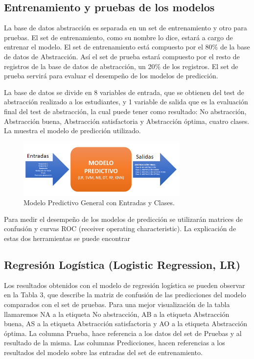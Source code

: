 \documentclass{textolivre}
\begin{document}
\subsection{Entrenamiento y pruebas de los modelos}
La base de datos abstracción es separada en un set de entrenamiento y otro para pruebas. El set de entrenamiento, como su nombre lo dice, estará a cargo de entrenar el modelo. El set de entrenamiento está compuesto por el 80\% de la base de datos de Abstracción. Así el set de prueba estará compuesto por el resto de registros de la base de datos de abstracción, un 20\% de los registros. El set de prueba servirá para evaluar el desempeño de los modelos de predicción.

La base de datos se divide en 8 variables de entrada, que se obtienen del test de abstracción realizado a los estudiantes, y 1 variable de salida que es la evaluación final del test de abstracción, la cual puede tener como resultado: No abstracción, Abstracción buena, Abstracción satisfactoria y Abstracción óptima, cuatro clases. La  muestra el modelo de predicción utilizado.

\begin{figure}[htbp]
 \centering
 \includegraphics[width=0.75\textwidth]{figura7.png}
 \caption{Modelo Predictivo General con Entradas y Clases.}
 \label{figura7}
\end{figure}

Para medir el desempeño de los modelos de predicción se utilizarán matrices de confusión y curvas ROC (receiver operating characteristic). La explicación de estas dos herramientas se puede encontrar \cite{chambers1992} %

\subsection{Regresión Logística (Logistic Regression, LR)}
Los resultados obtenidos con el modelo de regresión logística se pueden observar en la Tabla 3, que describe la matriz de confusión de las predicciones del modelo comparados con el set de pruebas. Para una mejor visualización de la tabla llamaremos NA a la etiqueta No abstracción, AB a la etiqueta Abstracción buena, AS a la etiqueta Abstracción satisfactoria y AO a la etiqueta Abstracción óptima. La columna Prueba, hace referencia a los datos del set de Pruebas y al resultado de la misma. Las columnas Predicciones, hacen referencias a los resultados del modelo sobre las entradas del set de entrenamiento.
\end{document}
